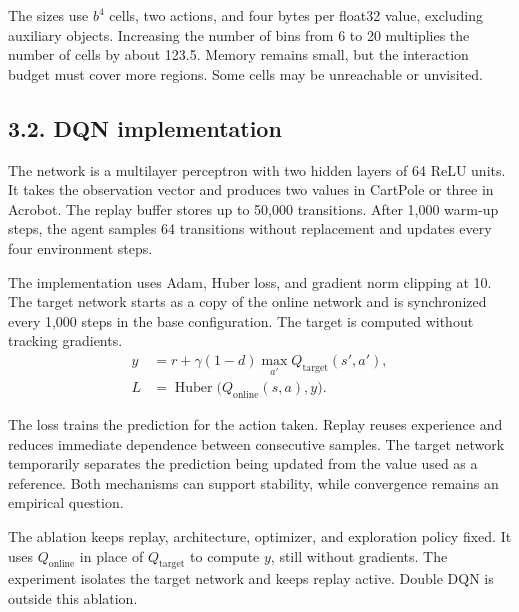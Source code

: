 \documentclass[10pt,a4paper,twocolumn]{extarticle}
\begin{document}
The sizes use $b^4$ cells, two actions, and four bytes per float32 value, excluding auxiliary objects. Increasing the number of bins from 6 to 20 multiplies the number of cells by about 123.5. Memory remains small, but the interaction budget must cover more regions. Some cells may be unreachable or unvisited.

\subsection*{3.2. DQN implementation}
The network is a multilayer perceptron with two hidden layers of 64 ReLU units. It takes the observation vector and produces two values in CartPole or three in Acrobot. The replay buffer stores up to 50,000 transitions. After 1,000 warm-up steps, the agent samples 64 transitions without replacement and updates every four environment steps.

The implementation uses Adam, Huber loss, and gradient norm clipping at 10. The target network starts as a copy of the online network and is synchronized every 1,000 steps in the base configuration. The target is computed without tracking gradients.
\begin{align*}
y &= r+\gamma(1-d)\max_{a'}Q_{\mathrm{target}}(s',a'),\\
L &= \operatorname{Huber}\big(Q_{\mathrm{online}}(s,a),y\big).
\end{align*}

The loss trains the prediction for the action taken. Replay reuses experience and reduces immediate dependence between consecutive samples. The target network temporarily separates the prediction being updated from the value used as a reference. Both mechanisms can support stability, while convergence remains an empirical question.

The ablation keeps replay, architecture, optimizer, and exploration policy fixed. It uses $Q_{\mathrm{online}}$ in place of $Q_{\mathrm{target}}$ to compute $y$, still without gradients. The experiment isolates the target network and keeps replay active. Double DQN is outside this ablation.

\newpage
\end{document}
